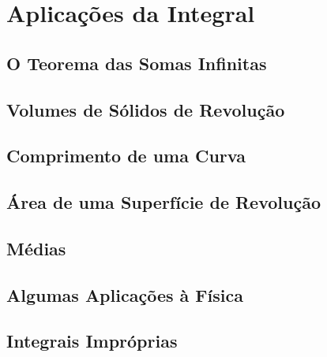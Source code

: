 \chapter{Aplicações da Integral}
\label{chp:appintegral}

\section{O Teorema das Somas Infinitas}
\label{sec:infsumtheo}

\section{Volumes de Sólidos de Revolução}
\label{sec:solidrev}

\section{Comprimento de uma Curva}
\label{sec:curvelength}

\section{Área de uma Superfície de Revolução}
\label{sec:arearev}

\section{Médias}
\label{sec:averages}

\section{Algumas Aplicações à Física}
\label{sec:physics}

\section{Integrais Impróprias}
\label{sec:improperints}

\begin{chapterproblems}
\end{chapterproblems}


